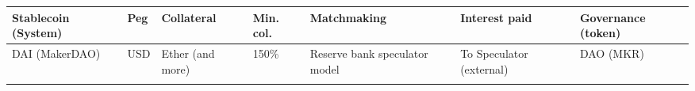 \documentclass[english,]{IEEEtran}
\begin{document}
\begin{longtable}[]{@{}lllllll@{}}
\toprule
\begin{minipage}[b]{0.12\columnwidth}\raggedright\strut
Stablecoin (System)\strut
\end{minipage} & \begin{minipage}[b]{0.04\columnwidth}\raggedright\strut
Peg\strut
\end{minipage} & \begin{minipage}[b]{0.10\columnwidth}\raggedright\strut
Collateral\strut
\end{minipage} & \begin{minipage}[b]{0.06\columnwidth}\raggedright\strut
Min. col.\strut
\end{minipage} & \begin{minipage}[b]{0.16\columnwidth}\raggedright\strut
Matchmaking\strut
\end{minipage} & \begin{minipage}[b]{0.20\columnwidth}\raggedright\strut
Interest paid\strut
\end{minipage} & \begin{minipage}[b]{0.12\columnwidth}\raggedright\strut
Governance (token)\strut
\end{minipage}\tabularnewline
\midrule
\endhead
\begin{minipage}[t]{0.12\columnwidth}\raggedright\strut
DAI (MakerDAO)\strut
\end{minipage} & \begin{minipage}[t]{0.04\columnwidth}\raggedright\strut
USD\strut
\end{minipage} & \begin{minipage}[t]{0.10\columnwidth}\raggedright\strut
Ether (and more)\strut
\end{minipage} & \begin{minipage}[t]{0.06\columnwidth}\raggedright\strut
150\%\strut
\end{minipage} & \begin{minipage}[t]{0.16\columnwidth}\raggedright\strut
Reserve bank speculator model\strut
\end{minipage} & \begin{minipage}[t]{0.20\columnwidth}\raggedright\strut
To Speculator (external)\strut
\end{minipage} & \begin{minipage}[t]{0.12\columnwidth}\raggedright\strut
DAO (MKR)\strut
\end{minipage}\tabularnewline
\begin{minipage}[t]{0.12\columnwidth}\raggedright\strut

\end{minipage}
\end{longtable}
\end{document}

